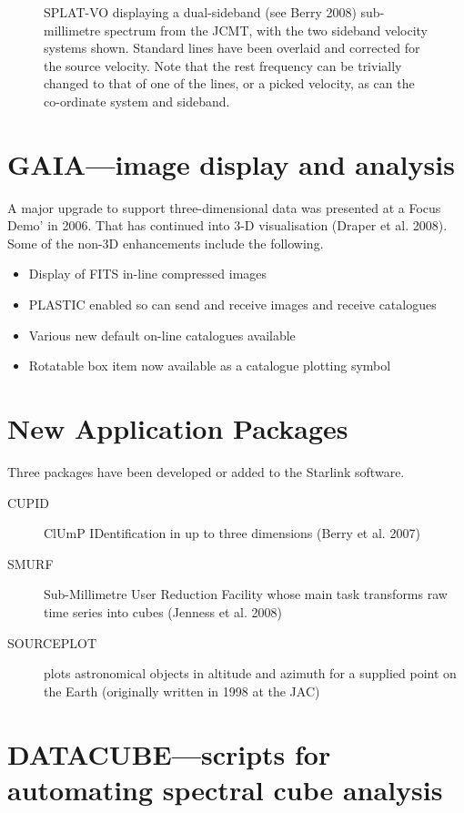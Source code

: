 \documentclass[11pt,twoside]{article}  %
\begin{document}
\begin{figure}
\caption{
SPLAT-VO displaying a dual-sideband (see Berry 2008) sub-millimetre spectrum
from the JCMT, with the two sideband velocity systems shown.  Standard
lines have been overlaid and corrected for the source velocity. Note
that the rest frequency can be trivially changed to that of one of the
lines, or a picked velocity, as can the co-ordinate system and sideband.}
\label{fig:P8.11_2}
\end{figure}

\section{GAIA---image display and analysis}
A major upgrade to support three-dimensional data was presented at a
Focus Demo'
in 2006.  That has continued into 3-D visualisation (Draper et al. 2008).
Some of the non-3D enhancements include the following.
\begin{itemize}
\item Display of FITS in-line compressed images
\item PLASTIC enabled so can send and receive images and receive catalogues
\item Various new default on-line catalogues available
\item Rotatable box item now available as a catalogue plotting symbol
\end{itemize}

\section{New Application Packages}

Three packages have been developed or added to the Starlink software.
\begin{description}
\item[{\footnotesize CUPID}] ClUmP IDentification in up to three
dimensions (Berry et al. 2007)
\item[{\footnotesize SMURF}] Sub-Millimetre User Reduction Facility
whose main task transforms raw time series into cubes (Jenness et al. 2008)
\item[{\footnotesize SOURCEPLOT}] plots astronomical objects in 
altitude  and azimuth for a supplied point on the Earth (originally written 
in 1998 at the JAC)
\end{description}

\section{DATACUBE---scripts for automating spectral cube analysis}
\end{document}
